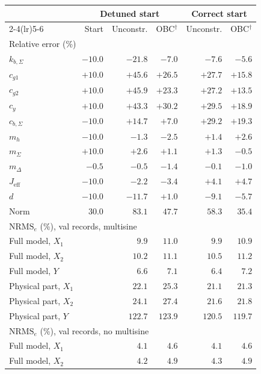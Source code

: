 \setlength{\tabcolsep}{3pt}
\begin{tabular}{l r r r r r}
\toprule
 & \multicolumn{3}{c}{Detuned start} & \multicolumn{2}{c}{Correct start}\\
\cmidrule(lr){2-4}\cmidrule(lr){5-6}
 & Start & Unconstr. & OBC$^\dagger$ & Unconstr. & OBC$^\dagger$\\
\midrule
\multicolumn{6}{l}{Relative error (\%)}\\
$k_{b,\Sigma}$ & $-10.0$ & $-21.8$ & $-7.0$ & $-7.6$ & $-5.6$\\
$c_{g1}$ & $+10.0$ & $+45.6$ & $+26.5$ & $+27.7$ & $+15.8$\\
$c_{g2}$ & $+10.0$ & $+45.9$ & $+23.3$ & $+27.2$ & $+13.5$\\
$c_y$ & $+10.0$ & $+43.3$ & $+30.2$ & $+29.5$ & $+18.9$\\
$c_{b,\Sigma}$ & $-10.0$ & $+14.7$ & $+7.0$ & $+29.2$ & $+19.3$\\
$m_h$ & $-10.0$ & $-1.3$ & $-2.5$ & $+1.4$ & $+2.6$\\
$m_\Sigma$ & $+10.0$ & $+2.6$ & $+1.1$ & $+1.3$ & $-0.5$\\
$m_\Delta$ & $-0.5$ & $-0.5$ & $-1.4$ & $-0.1$ & $-1.0$\\
$J_{\mathrm{eff}}$ & $-10.0$ & $-2.2$ & $-3.4$ & $+4.1$ & $+4.7$\\
$d$ & $-10.0$ & $-11.7$ & $+1.0$ & $-9.1$ & $-5.7$\\
Norm & $30.0$ & $83.1$ & $47.7$ & $58.3$ & $35.4$\\
\midrule
\multicolumn{6}{l}{$\mathrm{NRMS}_e$ (\%), val records, multisine}\\
Full model, $X_1$ &  & $9.9$ & $11.0$ & $9.9$ & $10.9$\\
Full model, $X_2$ &  & $10.2$ & $11.1$ & $10.5$ & $11.2$\\
Full model, $Y$ &  & $6.6$ & $7.1$ & $6.4$ & $7.2$\\
Physical part, $X_1$ &  & $22.1$ & $25.3$ & $21.1$ & $21.3$\\
Physical part, $X_2$ &  & $24.1$ & $27.4$ & $21.6$ & $21.8$\\
Physical part, $Y$ &  & $122.7$ & $123.9$ & $120.5$ & $119.7$\\
\midrule
\multicolumn{6}{l}{$\mathrm{NRMS}_e$ (\%), val records, no multisine}\\
Full model, $X_1$ &  & $4.1$ & $4.6$ & $4.1$ & $4.6$\\
Full model, $X_2$ &  & $4.2$ & $4.9$ & $4.3$ & $4.9$\\

\end{tabular}
